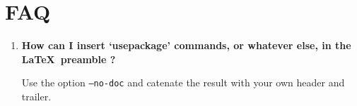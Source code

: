 \documentclass[12pt]{article}
\begin{document}
\section{FAQ}

\begin{enumerate}
\item \textbf{How can I insert `usepackage' commands, or whatever else,
  in the \LaTeX\ preamble ?} ~\par

  Use the option \texttt{--no-doc} and catenate the result with your
  own header and trailer.

\end{enumerate}



\end{document}
